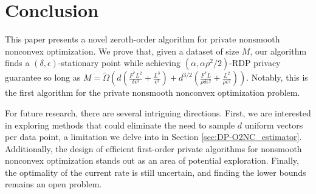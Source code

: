 \section{Conclusion}

This paper presents a novel zeroth-order algorithm for private nonsmooth nonconvex optimization. We prove that, given a dataset of size $M$, our algorithm finds a $(\delta,\epsilon)$-stationary point while achieving $(\alpha,\alpha\rho^2/2)$-RDP privacy guarantee so long as $M=\tilde\Omega \left( d(\frac{F^*L^2}{\delta\epsilon^3} + \frac{L^3}{\epsilon^3}) + d^{3/2}(\frac{F^*L}{\rho\delta\epsilon^2} + \frac{L^2}{\rho\epsilon^2}) \right)$. Notably, this is the first algorithm for the private nonsmooth nonconvex optimization problem.

For future research, there are several intriguing directions. First, we are interested in exploring methods that could eliminate the need to sample $d$ uniform vectors per data point, a limitation we delve into in Section \ref{sec:DP-O2NC_estimator}. Additionally, the design of efficient first-order private algorithms for nonsmooth nonconvex optimization stands out as an area of potential exploration. Finally, the optimality of the current rate is still uncertain, and finding the lower bounds remains an open problem.